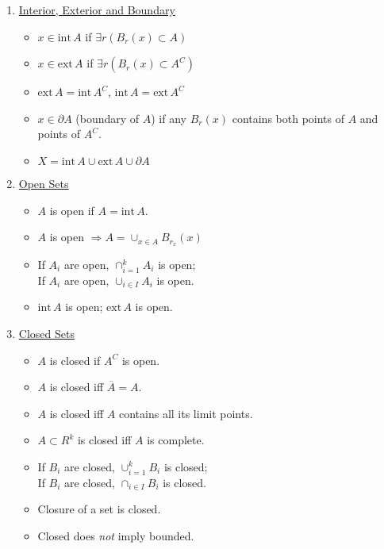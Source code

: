 \documentclass[%
 aip,
 jmp,%
 amsmath,amssymb,
 reprint,%
]{revtex4-1}
\def\interior{\mathrm{int\,}}
\def\exterior{\mathrm{ext\,}}
\newcommand{\imply}{\Rightarrow}
\newcommand{\defn}[1]{\underline{#1}}
\newcommand{\closure}[1]{\overline{#1}}
\begin{document}
\begin{enumerate}
  \item \defn{Interior, Exterior and Boundary}
      \begin{itemize}
        \item $x \in \interior A$ if $\exists r (B_r(x)\subset A)$
        \item $x \in \exterior A$ if $\exists r (B_r(x)\subset A^C)$
        \item $\exterior A = \interior A^C$, $\interior A = \exterior A^C$
        \item $x \in \partial A$ (boundary of $A$) if any $B_r(x)$ contains
        both points of $A$ and points of $A^C$.
        \item $X = \interior A \cup \exterior A \cup \partial A$
      \end{itemize}

  \item \defn{Open Sets}
      \begin{itemize}
        \item $A$ is open if $A = \interior A$.
        \item $A$ is open $\imply A = \cup_{x\in A}B_{r_x}(x)$
        \item If $A_i$ are open, $\cap_{i=1}^{k} A_i$ is open;\\
              If $A_i$ are open, $\cup_{i\in I} A_i$ is open.
        \item $\interior A$ is open; $\exterior A$ is open.
      \end{itemize}

   \item \defn{Closed Sets}
      \begin{itemize}
        \item $A$ is closed if $A^C$ is open.
        \item $A$ is closed iff $\closure{A}=A$.
        \item $A$ is closed iff $A$ contains all its limit points.
        \item $A\subset R^k$ is closed iff $A$ is complete.
        \item If $B_i$ are closed, $\cup_{i=1}^{k} B_i$ is closed;\\
              If $B_i$ are closed, $\cap_{i\in I} B_i$ is closed.
        \item Closure of a set is closed.
        \item Closed does \emph{not} imply bounded.

      \end{itemize}


\end{enumerate}
\end{document}
